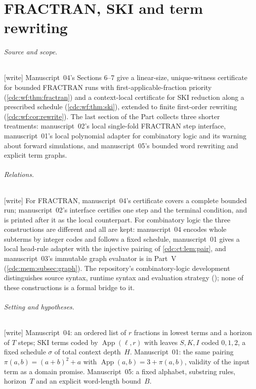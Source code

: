 \documentclass[11pt,a4paper]{article}
\theoremstyle{definition}
\theoremstyle{remark}
\newcommand{\App}{\operatorname{App}}
\newcommand{\wtag}{\textup{[write]}}%
\begin{document}
\part{FRACTRAN, SKI and term rewriting}\label{cdc:part:rewriting}

\paragraph{Source and scope.} \wtag{} Manuscript~04's Sections 6--7 give a linear-size, unique-witness certificate for bounded FRACTRAN runs with first-applicable-fraction priority (\cref{cdc:wf:thm:fractran}) and a context-local certificate for SKI reduction along a prescribed schedule (\cref{cdc:wf:thm:ski}), extended to finite first-order rewriting (\cref{cdc:wf:cor:rewrite}). The last section of the Part collects three shorter treatments: manuscript~02's local single-fold FRACTRAN step interface, manuscript~01's local polynomial adapter for combinatory logic and its warning about forward simulations, and manuscript~05's bounded word rewriting and explicit term graphs.

\paragraph{Relations.} \wtag{} For FRACTRAN, manuscript~04's certificate covers a complete bounded run; manuscript~02's interface certifies one step and the terminal condition, and is printed after it as the local counterpart. For combinatory logic the three constructions are different and all are kept: manuscript~04 encodes whole subterms by integer codes and follows a fixed schedule, manuscript~01 gives a local head-rule adapter with the injective pairing of \cref{cdc:ct:lem:pair}, and manuscript~03's immutable graph evaluator is in Part~V (\cref{cdc:mem:subsec:graph}). The repository's combinatory-logic development distinguishes source syntax, runtime syntax and evaluation strategy (\cite{repo-cl}); none of these constructions is a formal bridge to it.

\paragraph{Setting and hypotheses.} \wtag{} Manuscript~04: an ordered list of $r$ fractions in lowest terms and a horizon of $T$ steps; SKI terms coded by $\App(\ell,r)$ with leaves $S,K,I$ coded $0,1,2$, a fixed schedule $\sigma$ of total context depth~$H$. Manuscript~01: the same pairing $\pi(a,b)=(a+b)^2+a$ with $\operatorname{App}(a,b)=3+\pi(a,b)$, validity of the input term as a domain promise. Manuscript~05: a fixed alphabet, substring rules, horizon~$T$ and an explicit word-length bound~$B$.
\end{document}
